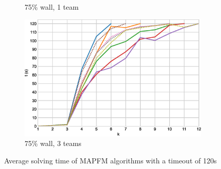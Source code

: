 \documentclass[english,10pt]{article}
\begin{document}
\begin{figure}[b]
\begin{subfigure}{0.44\textwidth}
			\caption{75\% wall, 1 team}
			\label{fig:r-75-1}
		\end{subfigure}
		\begin{subfigure}{0.44\textwidth}
			\centering
			\includegraphics[width=\linewidth]{img/results/relative-comparison/75-3}
			\caption{75\% wall, 3 teams}
			\label{fig:r-75-3}
		\end{subfigure}
		\caption{Average solving time of MAPFM algorithms with a timeout of 120s}
		\label{fig:r-times}
	\end{figure}
	
	\restoregeometry
\end{document}
